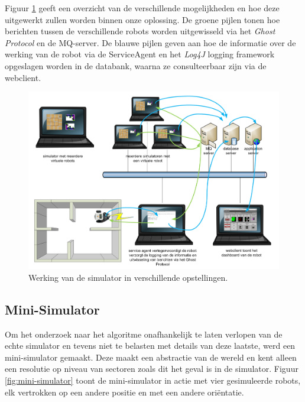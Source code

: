 \documentclass[12pt,a4paper]{report}
\begin{document}
Figuur \ref{fig:simulator-modi} geeft een overzicht van de verschillende mogelijkheden en hoe deze uitgewerkt zullen worden binnen onze oplossing. De groene pijlen tonen hoe berichten tussen de verschillende robots worden uitgewisseld via het \emph{Ghost Protocol} en de MQ-server. De blauwe pijlen geven aan hoe de informatie over de werking van de robot via de ServiceAgent en het \emph{Log4J} logging framework opgeslagen worden in de databank, waarna ze consulteerbaar zijn via de webclient.

\begin{figure}[htbp]
  \centering
  \includegraphics[width=200mm, angle=90]{resources/simulator-modi.png}
  \caption{Werking van de simulator in verschillende opstellingen.}
  \label{fig:simulator-modi}
\end{figure}

\subsection{Mini-Simulator}
\label{sect:mini-simulator}
Om het onderzoek naar het algoritme onafhankelijk te laten verlopen van de echte simulator en tevens niet te belasten met details van deze laatste, werd een mini-simulator gemaakt. Deze maakt een abstractie van de wereld en kent alleen een resolutie op niveau van sectoren zoals dit het geval is in de simulator. Figuur \ref{fig:mini-simulator} toont de mini-simulator in actie met vier gesimuleerde robots, elk vertrokken op een andere positie en met een andere ori\"entatie.
\end{document}
